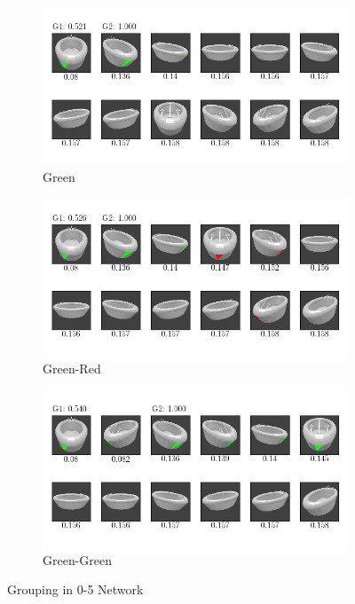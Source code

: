 \begin{figure}
	\centering
	\begin{subfigure}{\textwidth}
		\includegraphics[trim=10 20 10 20, clip]{images/mn-sl-0-5-20/bathtub_0107_1_grouping.png}
		\caption{Green}
		\label{fig:grouping-0-5-green}
	\end{subfigure}
	\begin{subfigure}{\textwidth}
		\includegraphics[trim=10 20 10 20, clip]{images/mn-sl-0-5-20/bathtub_0107_3_grouping.png}
		\caption{Green-Red}
		\label{fig:grouping-0-5-green-red}
	\end{subfigure}
	\begin{subfigure}{\textwidth}
		\includegraphics[trim=10 20 10 20, clip]{images/mn-sl-0-5-20/bathtub_0107_4_grouping.png}
		\caption{Green-Green}
		\label{fig:grouping-0-5-green-green}
	\end{subfigure}
	\caption[Grouping in 0-5 Network]{Grouping in 0-5 Network}
	\label{fig:grouping-0-5}
\end{figure}
